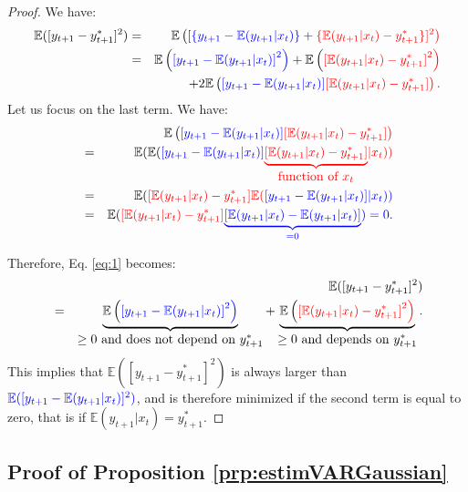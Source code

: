\documentclass[
]{book}
\theoremstyle{definition}
\theoremstyle{definition}
\theoremstyle{definition}
\theoremstyle{definition}
\theoremstyle{remark}
\begin{document}
\begin{proof}
We have:
\begin{eqnarray}
\mathbb{E}([y_{t+1} - y^*_{t+1}]^2) &=& \mathbb{E}\left([\color{blue}{\{y_{t+1} - \mathbb{E}(y_{t+1}|x_t)\}} + \color{red}{\{\mathbb{E}(y_{t+1}|x_t)  - y^*_{t+1}\}}]^2\right)\nonumber\\
&=&  \mathbb{E}\left(\color{blue}{[y_{t+1} - \mathbb{E}(y_{t+1}|x_t)]}^2\right) + \mathbb{E}\left(\color{red}{[\mathbb{E}(y_{t+1}|x_t)  - y^*_{t+1}]}^2\right)\nonumber\\
&& + 2\mathbb{E}\left( \color{blue}{[y_{t+1} - \mathbb{E}(y_{t+1}|x_t)]}\color{red}{ [\mathbb{E}(y_{t+1}|x_t)  - y^*_{t+1}]}\right). \label{eq:1}
\end{eqnarray}
Let us focus on the last term. We have:
\begin{eqnarray*}
&&\mathbb{E}\left(\color{blue}{[y_{t+1} - \mathbb{E}(y_{t+1}|x_t)]}\color{red}{ [\mathbb{E}(y_{t+1}|x_t)  - y^*_{t+1}]}\right)\\
&=& \mathbb{E}( \mathbb{E}( \color{blue}{[y_{t+1} - \mathbb{E}(y_{t+1}|x_t)]}\color{red}{ \underbrace{[\mathbb{E}(y_{t+1}|x_t)  - y^*_{t+1}]}_{\mbox{function of $x_t$}}}|x_t))\\
&=& \mathbb{E}( \color{red}{ [\mathbb{E}(y_{t+1}|x_t)  - y^*_{t+1}]} \mathbb{E}( \color{blue}{[y_{t+1} - \mathbb{E}(y_{t+1}|x_t)]}|x_t))\\
&=& \mathbb{E}( \color{red}{ [\mathbb{E}(y_{t+1}|x_t)  - y^*_{t+1}]} \color{blue}{\underbrace{[\mathbb{E}(y_{t+1}|x_t) - \mathbb{E}(y_{t+1}|x_t)]}_{=0}})=0.
\end{eqnarray*}

Therefore, Eq. \eqref{eq:1} becomes:
\begin{eqnarray*}
&&\mathbb{E}([y_{t+1} - y^*_{t+1}]^2) \\
&=&  \underbrace{\mathbb{E}\left(\color{blue}{[y_{t+1} - \mathbb{E}(y_{t+1}|x_t)]}^2\right)}_{\mbox{$\ge 0$ and does not depend on $y^*_{t+1}$}} + \underbrace{\mathbb{E}\left(\color{red}{[\mathbb{E}(y_{t+1}|x_t)  - y^*_{t+1}]}^2\right)}_{\mbox{$\ge 0$ and depends on $y^*_{t+1}$}}.
\end{eqnarray*}
This implies that \(\mathbb{E}([y_{t+1} - y^*_{t+1}]^2)\) is always larger than \(\color{blue}{\mathbb{E}([y_{t+1} - \mathbb{E}(y_{t+1}|x_t)]^2)}\), and is therefore minimized if the second term is equal to zero, that is if \(\mathbb{E}(y_{t+1}|x_t) = y^*_{t+1}\).
\end{proof}

\hypertarget{estimVARGaussian}{%
\subsection{Proof of Proposition \ref{prp:estimVARGaussian}}\label{estimVARGaussian}}
\end{document}
